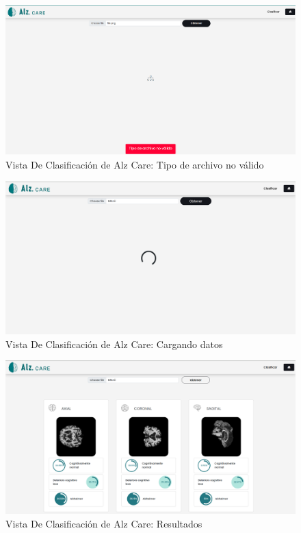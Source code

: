 \begin{figure}[H]
    \centering
    \includegraphics[width=\textwidth]{./imgs/app/final-cp-error}
    \caption{Vista De Clasificación de Alz Care: Tipo de archivo no válido}
    \label{fig:final-cp-error-page}
\end{figure}

\begin{figure}[H]
    \centering
    \includegraphics[width=\textwidth]{./imgs/app/final-cp-l}
    \caption{Vista De Clasificación de Alz Care: Cargando datos}
    \label{fig:final-cp-l-page}
\end{figure}

\begin{figure}[H]
    \centering
    \includegraphics[width=\textwidth]{./imgs/app/final-cp-r}
    \caption{Vista De Clasificación de Alz Care: Resultados}
    \label{fig:final-cp-r-page}
\end{figure}